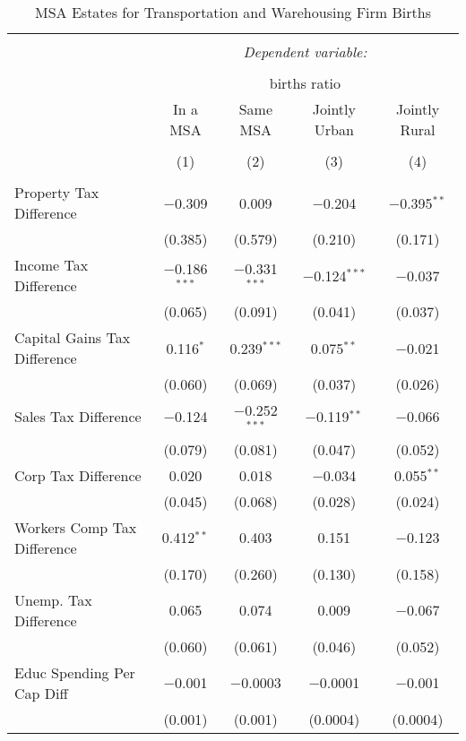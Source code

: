 
\begin{table}[!htbp] \centering 
  \caption{MSA Estates for  Transportation and Warehousing Firm Births} 
  \label{} 
\begin{tabular}{@{\extracolsep{5pt}}lcccc} 
\\[-1.8ex]\hline 
\hline \\[-1.8ex] 
 & \multicolumn{4}{c}{\textit{Dependent variable:}} \\ 
\cline{2-5} 
\\[-1.8ex] & \multicolumn{4}{c}{births ratio} \\ 
 & In a MSA & Same MSA & Jointly Urban & Jointly Rural \\ 
\\[-1.8ex] & (1) & (2) & (3) & (4)\\ 
\hline \\[-1.8ex] 
 Property Tax Difference & $-$0.309 & 0.009 & $-$0.204 & $-$0.395$^{**}$ \\ 
  & (0.385) & (0.579) & (0.210) & (0.171) \\ 
  Income Tax Difference & $-$0.186$^{***}$ & $-$0.331$^{***}$ & $-$0.124$^{***}$ & $-$0.037 \\ 
  & (0.065) & (0.091) & (0.041) & (0.037) \\ 
  Capital Gains Tax Difference & 0.116$^{*}$ & 0.239$^{***}$ & 0.075$^{**}$ & $-$0.021 \\ 
  & (0.060) & (0.069) & (0.037) & (0.026) \\ 
  Sales Tax Difference & $-$0.124 & $-$0.252$^{***}$ & $-$0.119$^{**}$ & $-$0.066 \\ 
  & (0.079) & (0.081) & (0.047) & (0.052) \\ 
  Corp Tax Difference & 0.020 & 0.018 & $-$0.034 & 0.055$^{**}$ \\ 
  & (0.045) & (0.068) & (0.028) & (0.024) \\ 
  Workers Comp Tax Difference & 0.412$^{**}$ & 0.403 & 0.151 & $-$0.123 \\ 
  & (0.170) & (0.260) & (0.130) & (0.158) \\ 
  Unemp. Tax Difference & 0.065 & 0.074 & 0.009 & $-$0.067 \\ 
  & (0.060) & (0.061) & (0.046) & (0.052) \\ 
  Educ Spending Per Cap Diff & $-$0.001 & $-$0.0003 & $-$0.0001 & $-$0.001 \\ 
  & (0.001) & (0.001) & (0.0004) & (0.0004) \\ 

\end{tabular}
\end{table}
